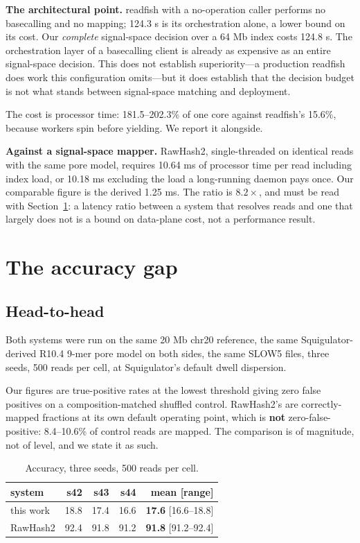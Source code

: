 \documentclass[conference]{IEEEtran}
\begin{document}
\textbf{The architectural point.} readfish with a no-operation caller performs no basecalling
and no mapping; 124.3 \textmu{}s is its orchestration alone, a lower bound on its cost. Our
\emph{complete} signal-space decision over a 64 Mb index costs 124.8 \textmu{}s. The orchestration layer
of a basecalling client is already as expensive as an entire signal-space decision. This does
not establish superiority---a production readfish does work this configuration omits---but it
does establish that the decision budget is not what stands between signal-space matching and
deployment.

The cost is processor time: 181.5--202.3\% of one core against readfish's 15.6\%, because
workers spin before yielding. We report it alongside.

\textbf{Against a signal-space mapper.} RawHash2, single-threaded on identical reads with the
same pore model, requires 10.64 ms of processor time per read including index load, or 10.18 ms
excluding the load a long-running daemon pays once. Our comparable figure is the derived
1.25 ms. The ratio is $8.2\times$, and must be read with Section~\ref{sec:gap}: a latency ratio between a
system that resolves reads and one that largely does not is a bound on data-plane cost, not a
performance result.

\section{The accuracy gap}
\label{sec:gap}

\subsection{Head-to-head}

Both systems were run on the same 20 Mb chr20 reference, the same Squigulator-derived R10.4
9-mer pore model on both sides, the same SLOW5 files, three seeds, 500 reads per cell, at
Squigulator's default dwell dispersion.

Our figures are true-positive rates at the lowest threshold giving zero false positives on a
composition-matched shuffled control. RawHash2's are correctly-mapped fractions at its own
default operating point, which is \textbf{not} zero-false-positive: 8.4--10.6\% of control reads
are mapped. The comparison is of magnitude, not of level, and we state it as such.

\begin{table}[t]
\caption{Accuracy, three seeds, 500 reads per cell.}
\label{tab:acc}
\centering
\footnotesize
\begin{tabular}{lrrrr}
\toprule
system & s42 & s43 & s44 & mean [range] \\
\midrule
this work  & 18.8 & 17.4 & 16.6 & \textbf{17.6} [16.6--18.8] \\
RawHash2   & 92.4 & 91.8 & 91.2 & \textbf{91.8} [91.2--92.4] \\
\bottomrule
\end{tabular}
\end{table}
\end{document}
